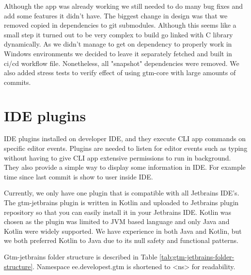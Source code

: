 Although the app was already working we still needed to do many bug fixes and add some features it didn't have.
The biggest change in design was that we removed copied in dependencies to git submodules.
Although this seems like a small step it turned out to be very complex to build go linked with C library dynamically.
As we didn't manage to get on dependency to properly work in Windows environments we decided to leave it separately fetched and built in ci/cd workflow file.
Nonetheless, all "snapshot" dependencies were removed.
We also added stress tests to verify effect of using gtm-core with large amounts of commits.

\section{IDE plugins}\label{sec:ide-plugins}
IDE plugins installed on developer IDE, and they execute CLI app commands on specific editor events.
Plugins are needed to listen for editor events such as typing without having to give CLI app extensive permissions to run in background.
They also provide a simple way to display some information in IDE.
For example time since last commit is show to user inside IDE.

Currently, we only have one plugin that is compatible with all Jetbrains IDE's.
The gtm-jetbrains plugin is written in Kotlin and uploaded to Jetbrains plugin repository so that you can easily install it in your Jetbrains IDE.
Kotlin was chosen as the plugin was limited to JVM based language and only Java and Kotlin were widely supported.
We have experience in both Java and Kotlin, but we both preferred Kotlin to Java due to its null safety and functional patterns.

Gtm-jetbrains folder structure is described in Table
\ref{tab:gtm-jetbrains-folder-structure}.
Namespace ee.developest.gtm is shortened to <ns> for readability.

